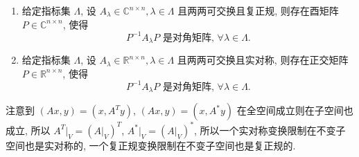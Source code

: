 \documentclass[../../main.tex]{subfiles}%
\begin{document}
\begin{proposition}\label{proposition:一族两两可交换的复正规 (实对称) 矩阵可同时酉 (正交) 相似对角化}
\begin{enumerate}
\item 给定指标集 \(\Lambda\), 设 \(A_{\lambda} \in \mathbb{C}^{n \times n}, \lambda \in \Lambda\) 且两两可交换且复正规, 则存在酉矩阵 \(P \in \mathbb{C}^{n \times n}\), 使得
\[
P^{-1}A_{\lambda}P \text{ 是对角矩阵, } \forall \lambda \in \Lambda.
\]

\item 给定指标集 \(\Lambda\), 设 \(A_{\lambda} \in \mathbb{R}^{n \times n}, \lambda \in \Lambda\) 且两两可交换且实对称, 则存在正交矩阵 \(P \in \mathbb{R}^{n \times n}\), 使得
\[
P^{-1}A_{\lambda}P \text{ 是对角矩阵, } \forall \lambda \in \Lambda.
\]
\end{enumerate}
\end{proposition}
\begin{note}
注意到 \((Ax, y) = (x, A^T y)\), \((Ax, y) = (x, A^* y)\) 在全空间成立则在子空间也成立, 所以 \(A^T|_V = (A|_V)^T\), \(A^*|_V = (A|_V)^*\), 所以一个实对称变换限制在不变子空间也是实对称的, 一个复正规变换限制在不变子空间也是复正规的.
\end{note}
\end{document}
